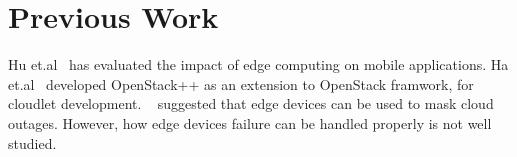 \section{Previous Work}
Hu et.al~\cite{quantify-edge} has evaluated the impact of edge computing on mobile applications.
Ha et.al~\cite{Ha2015OpenStackFC} developed OpenStack++ as an extension to OpenStack framwork,
for cloudlet development. ~\cite{edge-computing} suggested that edge devices can be used
to mask cloud outages. However, how edge devices failure can be handled properly is not well studied.
